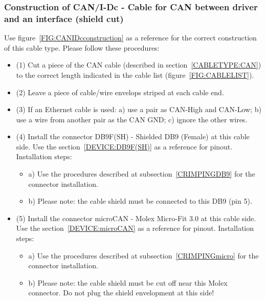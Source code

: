 \subsubsection{Construction of CAN/I-Dc - Cable for CAN between driver and an interface (shield cut)} \label{CONSTRUCTION:CANIDc}
Use figure~\ref{FIG:CANIDcconstruction} as a reference for the correct construction of this cable type. Please follow these procedures:
\begin{itemize}
  \item (1) Cut a piece of the CAN cable (described in section~\ref{CABLETYPE:CAN}) to the correct length indicated in the cable list (figure~\ref{FIG:CABLELIST}).
  \item (2) Leave a piece of cable/wire envelops striped at each cable end.
  \item (3) If an Ethernet cable is used: a) use a pair as CAN-High and CAN-Low; b) use a wire from another pair as the CAN GND; c) ignore the other wires.
  \item (4) Install the connector DB9F(SH) - Shielded DB9 (Female) at this cable side. Use the section~\ref{DEVICE:DB9F(SH)} as a reference for pinout. Installation steps:
  \begin{itemize}
    \item a) Use the procedures described at subsection~\ref{CRIMPINGDB9} for the connector installation.
    \item b) Please note: the cable shield must be connected to this DB9 (pin 5).
  \end{itemize}
  \item (5) Install the connector microCAN - Molex Micro-Fit 3.0 at this cable side. Use the section~\ref{DEVICE:microCAN} as a reference for pinout. Installation steps:
  \begin{itemize}
    \item a) Use the procedures described at subsection~\ref{CRIMPINGmicro} for the connector installation.
    \item b) Please note: the cable shield must be cut off near this Molex connector. Do not plug the shield envelopment at this side!
  \end{itemize}
\end{itemize}
